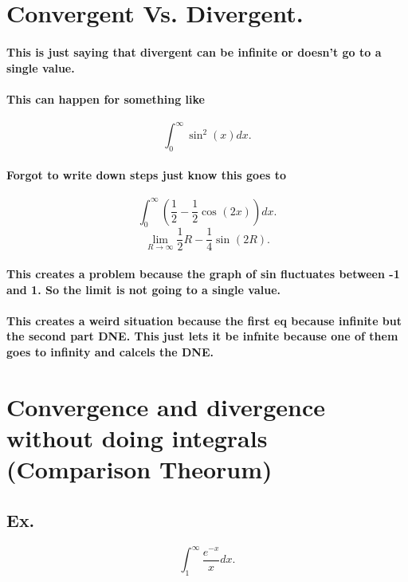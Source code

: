 \documentclass[a4paper]{article}
\begin{document}
\section{Convergent Vs. Divergent.}%
\label{sec:Convergent Vs. Divergent.}
\paragraph{This is just saying that divergent can be infinite or doesn't go to a single value. }
\paragraph{This can happen for something like }

\[
\int_{0}^{\infty} \sin^{2}(x)dx
.\] 
\paragraph{Forgot to write down steps just know this goes to }
\[
\int_{0}^{\infty} \left( \frac{1}{2}-\frac{1}{2}\cos^{}(2x) \right) dx
.\] 
\[
\lim_{R \to \infty} \frac{1}{2}R-\frac{1}{4}\sin^{}(2R)
.\] 
\newpage
\paragraph{This creates a problem because the graph of sin fluctuates between -1 and 1. So the limit is not going to a single value. }
\paragraph{This creates a weird situation because the first eq because infinite but the second part DNE. This just lets it be infnite because one of them goes to infinity and calcels the DNE. }%
\label{par:This creates a weird situation because the first eq because infinite but the second part DNE. This just lets it be infnite because one of them goes to infinity and calcels the DNE. }

\section{Convergence and divergence without doing integrals (Comparison Theorum)}%
\label{sec:Convergence and divergence without doing integrals (Comparison Theorum)}

\subsection{Ex.}%
\label{sub:Ex.}
\[
\int_{1}^{\infty} \frac{e^{-x}}{x}dx
.\] 
\end{document}
